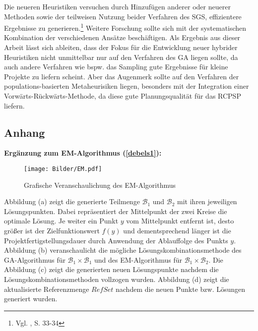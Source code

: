\documentclass[a4paper,12pt,normalheadings,footexclude,headinclude,liststotoc,nochapterprefix,onecolumn,oneside,parskip,pointlessnumbers]{scrreprt}
\begin{document}
Die neueren Heuristiken versuchen durch Hinzufügen anderer oder neuerer Methoden sowie der teilweisen Nutzung beider Verfahren des SGS, effizientere Ergebnisse zu generieren.\footnote{Vgl. \cite{kolisch2006experimental}, S. 33-34\label{ergeb2}} Weitere Forschung sollte sich mit der systematischen Kombination der verschiedenen Ansätze beschäftigen. Als Ergebnis aus dieser Arbeit lässt sich ableiten, dass der Fokus für die Entwicklung neuer hybrider Heuristiken nicht unmittelbar nur auf den Verfahren des GA liegen sollte, da auch andere Verfahren wie bspw. das Sampling gute Ergebnisse für kleine Projekte zu liefern scheint. Aber das Augenmerk sollte auf den Verfahren der populations-basierten Metaheurisiken liegen, besonders mit der Integration einer Vorwärts-Rückwärts-Methode, da diese gute Planungsqualität für das RCPSP liefern.









\begin{appendix}
\chapter*{Anhang}


\textbf{Ergänzung zum EM-Algorithmus (\ref{debels1}):}\\
\begin{figure}[h!]
  \begin{center}
\texttt{[image: Bilder/EM.pdf]}
 \caption{Grafische Veranschaulichung des EM-Algorithmus}\label{embild}
  \end{center}
\end{figure}

Abbildung (a) zeigt die generierte Teilmenge $\mathcal{B}_{1}$ und $\mathcal{B}_{2}$ mit ihren jeweiligen Lösungspunkten. Dabei repräsentiert der Mittelpunkt der zwei Kreise die optimale Lösung. Je weiter ein Punkt $y$ vom Mittelpunkt entfernt ist, desto größer ist der Zielfunktionswert $f(y)$ und dementsprechend länger ist die Projektfertigstellungsdauer durch Anwendung der Ablauffolge des Punkts $y$. Abbildung (b) veranschaulicht die mögliche Lösungskombinationsmethode des GA-Algorithmus für $\mathcal{B}_{1}\times \mathcal{B}_{1}$ und des EM-Algorithmus für $\mathcal{B}_{1}\times \mathcal{B}_{2}$. Die Abbildung (c) zeigt die generierten neuen Lösungspunkte nachdem die Lösungskombinationsmethoden vollzogen wurden. %
Abbildung (d) zeigt die aktualisierte Referenzmenge $RefSet$ nachdem die neuen Punkte bzw. Lösungen generiert wurden.
\end{appendix}
\end{document}
